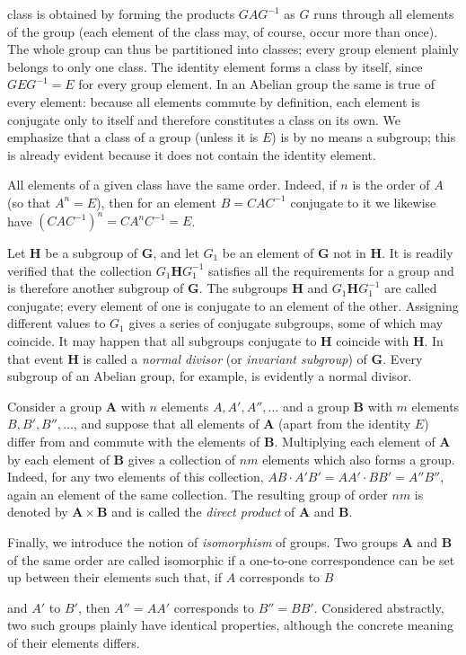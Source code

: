 class is obtained by forming the products $GAG^{-1}$ as $G$ runs through all elements of the group (each element of the class may, of course, occur more than once). The whole group can thus be partitioned into classes; every group element plainly belongs to only one class. The identity element forms a class by itself, since $GEG^{-1}=E$ for every group element. In an Abelian group the same is true of every element: because all elements commute by definition, each element is conjugate only to itself and therefore constitutes a class on its own. We emphasize that a class of a group (unless it is $E$) is by no means a subgroup; this is already evident because it does not contain the identity element.

All elements of a given class have the same order. Indeed, if $n$ is the order of $A$ (so that $A^n=E$), then for an element $B=CAC^{-1}$ conjugate to it we likewise have $(CAC^{-1})^n=CA^nC^{-1}=E$.

Let $\boldsymbol{H}$ be a subgroup of $\boldsymbol{G}$, and let $G_1$ be an element of $\boldsymbol{G}$ not in $\boldsymbol{H}$. It is readily verified that the collection $G_1\boldsymbol{H}G_1^{-1}$ satisfies all the requirements for a group and is therefore another subgroup of $\boldsymbol{G}$. The subgroups $\boldsymbol{H}$ and $G_1\boldsymbol{H}G_1^{-1}$ are called conjugate; every element of one is conjugate to an element of the other. Assigning different values to $G_1$ gives a series of conjugate subgroups, some of which may coincide. It may happen that all subgroups conjugate to $\boldsymbol{H}$ coincide with $\boldsymbol{H}$. In that event $\boldsymbol{H}$ is called a \emph{normal divisor} (or \emph{invariant subgroup}) of $\boldsymbol{G}$. Every subgroup of an Abelian group, for example, is evidently a normal divisor.

Consider a group $\boldsymbol{A}$ with $n$ elements $A,A',A'',\ldots$ and a group $\boldsymbol{B}$ with $m$ elements $B,B',B'',\ldots$, and suppose that all elements of $\boldsymbol{A}$ (apart from the identity $E$) differ from and commute with the elements of $\boldsymbol{B}$. Multiplying each element of $\boldsymbol{A}$ by each element of $\boldsymbol{B}$ gives a collection of $nm$ elements which also forms a group. Indeed, for any two elements of this collection, $AB\cdot A'B'=AA'\cdot BB'=A''B''$, again an element of the same collection. The resulting group of order $nm$ is denoted by $\boldsymbol{A}\times\boldsymbol{B}$ and is called the \emph{direct product} of $\boldsymbol{A}$ and $\boldsymbol{B}$.

Finally, we introduce the notion of \emph{isomorphism} of groups. Two groups $\boldsymbol{A}$ and $\boldsymbol{B}$ of the same order are called isomorphic if a one-to-one correspondence can be set up between their elements such that, if $A$ corresponds to $B$

and $A'$ to $B'$, then $A''=AA'$ corresponds to $B''=BB'$. Considered abstractly, two such groups plainly have identical properties, although the concrete meaning of their elements differs.

